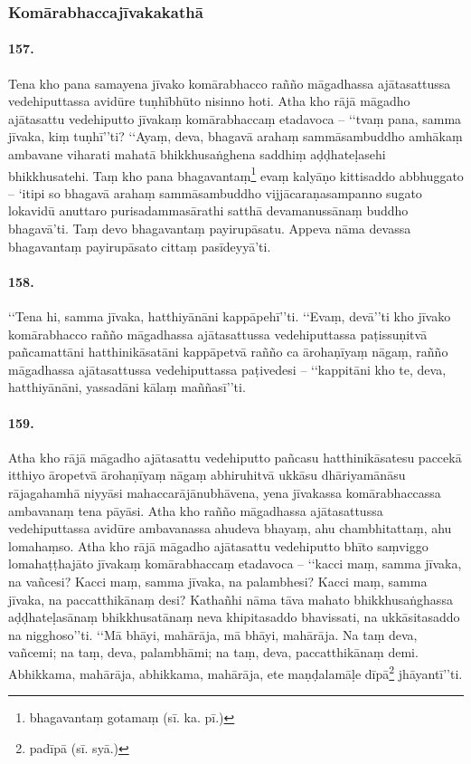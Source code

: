 \subsubsection{Komārabhaccajīvakakathā}

\paragraph{157.} Tena kho pana samayena jīvako komārabhacco rañño māgadhassa ajātasattussa vedehiputtassa avidūre tuṇhībhūto nisinno hoti. Atha kho rājā māgadho ajātasattu vedehiputto jīvakaṃ komārabhaccaṃ etadavoca – ‘‘tvaṃ pana, samma jīvaka, kiṃ tuṇhī’’ti? ‘‘Ayaṃ, deva, bhagavā arahaṃ sammāsambuddho amhākaṃ ambavane viharati mahatā bhikkhusaṅghena saddhiṃ aḍḍhateḷasehi bhikkhusatehi. Taṃ kho pana bhagavantaṃ\footnote{bhagavantaṃ gotamaṃ (sī. ka. pī.)} evaṃ kalyāṇo kittisaddo abbhuggato – ‘itipi so bhagavā arahaṃ sammāsambuddho vijjācaraṇasampanno sugato lokavidū anuttaro purisadammasārathi satthā devamanussānaṃ buddho bhagavā’ti. Taṃ devo bhagavantaṃ payirupāsatu. Appeva nāma devassa bhagavantaṃ payirupāsato cittaṃ pasīdeyyā’ti.

\paragraph{158.} ‘‘Tena hi, samma jīvaka, hatthiyānāni kappāpehī’’ti. ‘‘Evaṃ, devā’’ti kho jīvako komārabhacco rañño māgadhassa ajātasattussa vedehiputtassa paṭissuṇitvā pañcamattāni hatthinikāsatāni kappāpetvā rañño ca ārohaṇīyaṃ nāgaṃ, rañño māgadhassa ajātasattussa vedehiputtassa paṭivedesi – ‘‘kappitāni kho te, deva, hatthiyānāni, yassadāni kālaṃ maññasī’’ti.

\paragraph{159.} Atha kho rājā māgadho ajātasattu vedehiputto pañcasu hatthinikāsatesu paccekā itthiyo āropetvā ārohaṇīyaṃ nāgaṃ abhiruhitvā ukkāsu dhāriyamānāsu rājagahamhā niyyāsi mahaccarājānubhāvena, yena jīvakassa komārabhaccassa ambavanaṃ tena pāyāsi. Atha kho rañño māgadhassa ajātasattussa vedehiputtassa avidūre ambavanassa ahudeva bhayaṃ, ahu chambhitattaṃ, ahu lomahaṃso. Atha kho rājā māgadho ajātasattu vedehiputto bhīto saṃviggo lomahaṭṭhajāto jīvakaṃ komārabhaccaṃ etadavoca – ‘‘kacci maṃ, samma jīvaka, na vañcesi? Kacci maṃ, samma jīvaka, na palambhesi? Kacci maṃ, samma jīvaka, na paccatthikānaṃ desi? Kathañhi nāma tāva mahato bhikkhusaṅghassa aḍḍhateḷasānaṃ bhikkhusatānaṃ neva khipitasaddo bhavissati, na ukkāsitasaddo na nigghoso’’ti. ‘‘Mā bhāyi, mahārāja, mā bhāyi, mahārāja. Na taṃ deva, vañcemi; na taṃ, deva, palambhāmi; na taṃ, deva, paccatthikānaṃ demi. Abhikkama, mahārāja, abhikkama, mahārāja, ete maṇḍalamāḷe dīpā\footnote{padīpā (sī. syā.)} jhāyantī’’ti.

